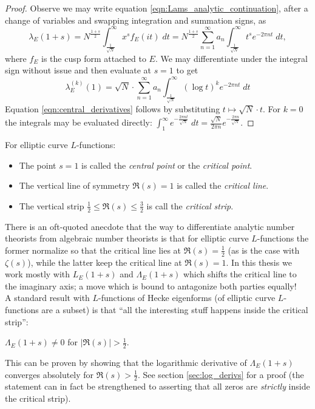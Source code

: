 \documentclass[10pt]{article}
\begin{document}
\begin{proof}
Observe we may write equation \ref{eqn:Lams_analytic_continuation}, after a change of variables and swapping integration and summation signs, as
\begin{equation*}
\lambda_E(1+s) = N^{\frac{1+s}{2}}  \int_{\frac{1}{\sqrt{N}}}^{\infty} x^s f_E(it) \; dt  = N^{\frac{1+s}{2}}  \sum_{n=1}^\infty a_n \int_{\frac{1}{\sqrt{N}}}^{\infty} t^s e^{-2\pi nt} \; dt,
\end{equation*}
where $f_E$ is the cusp form attached to $E$. We may differentiate under the integral sign without issue and then evaluate at $s=1$ to get
\begin{equation}\label{eqn:lambda_derivs}
\lambda_E^{(k)}(1) = \sqrt{N}\cdot \sum_{n=1}^\infty a_n \int_{\frac{1}{\sqrt{N}}}^{\infty} (\log t)^k e^{-2\pi n t} \; dt
\end{equation}
Equation \ref{eqn:central_derivatives} follows by substituting $t \mapsto \sqrt{N} \cdot t$. For $k=0$ the integrals may be evaluated directly: $\int_{1}^{\infty} e^{-\frac{2\pi n t}{\sqrt{N}}} \; dt = \frac{\sqrt{N}}{2\pi n} e^{-\frac{2\pi n}{\sqrt{N}}}$.
\end{proof}

\begin{definition} For elliptic curve $L$-functions:
\begin{itemize}
\item The point $s=1$ is called the {\it central point} or the {\it critical point}.
\item The vertical line of symmetry $\Re(s)=1$ is called the {\it critical line}.
\item The vertical strip $\frac{1}{2} \le \Re(s) \le \frac{3}{2}$ is call the {\it critical strip}.
\end{itemize}
\end{definition}

There is an oft-quoted anecdote that the way to differentiate analytic number theorists from algebraic number theorists is that for elliptic curve $L$-functions the former normalize so that the critical line lies at $\Re(s) = \frac{1}{2}$ (as is the case with $\zeta(s)$), while the latter keep the critical line at $\Re(s)=1$. In this thesis we work mostly with $L_E(1+s)$ and $\Lambda_E(1+s)$ which shifts the critical line to the imaginary axis; a move which is bound to antagonize both parties equally! \\

A standard result with $L$-functions of Hecke eigenforms (of elliptic curve $L$-functions are a subset) is that ``all the interesting stuff happens inside the critical strip'':
\begin{proposition}
$\Lambda_E(1+s) \ne 0$ for $|\Re(s)| > \frac{1}{2}$.
\end{proposition}
This can be proven by showing that the logarithmic derivative of $\Lambda_E(1+s)$ converges absolutely for $\Re(s) > \frac{1}{2}$. See section \ref{sec:log_derivs} for a proof (the statement can in fact be strengthened to asserting that all zeros are {\it strictly} inside the critical strip). \\
\end{document}
